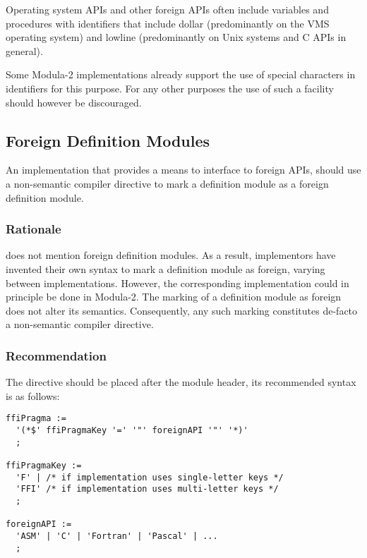 \documentclass[10pt,a4paper]{article}
\begin{document}
Operating system \Glspl{API} and other \glspl{foreign API} often include
variables and procedures with identifiers that include dollar (predominantly
on the VMS operating system) and lowline (predominantly on Unix systems and
C \glspl{API} in general).

Some Modula-2 implementations already support the use of special characters in
identifiers for this purpose. For any other purposes the use of such a facility
should however be discouraged.


\subsection{Foreign Definition Modules}

An implementation that provides a means to interface to \glspl{foreign API},
should use a \gls{non-semantic compiler directive} to mark a definition module
as a \gls{foreign definition module}.

\subsubsection{Rationale}

\cite{Wirth88} does not mention \glspl{foreign definition module}. As a result,
implementors have invented their own syntax to mark a definition module as
foreign, varying between implementations. However, the corresponding
implementation could in principle be done in Modula-2. The marking of a
definition module as foreign does not alter its semantics. Consequently, any
such marking constitutes de-facto a \gls{non-semantic compiler directive}.

\subsubsection{Recommendation}

The directive should be placed after the module header, its recommended syntax
is as follows:

\begin{verbatim}
ffiPragma :=
  '(*$' ffiPragmaKey '=' '"' foreignAPI '"' '*)'
  ;
  
ffiPragmaKey :=
  'F' | /* if implementation uses single-letter keys */
  'FFI' /* if implementation uses multi-letter keys */
  ; 

foreignAPI :=
  'ASM' | 'C' | 'Fortran' | 'Pascal' | ...
  ;
\end{verbatim}
\end{document}
